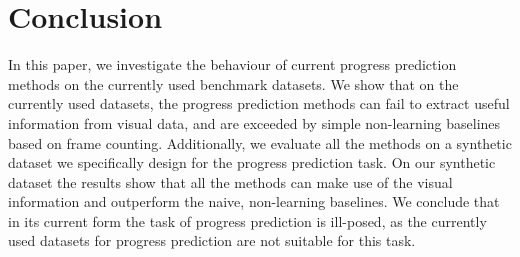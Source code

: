 \section{Conclusion}
\label{sec:conclusion}
In this paper, we investigate the behaviour of current progress prediction methods on the currently used benchmark datasets. 
We show that on the currently used datasets, the progress prediction methods can fail to extract useful information from visual data, and are exceeded by simple non-learning baselines based on frame counting. 
Additionally, we evaluate all the methods on a synthetic dataset we specifically design for the progress prediction task. 
On our synthetic dataset the results show that all the methods can make use of the visual information and outperform the naive, non-learning baselines. 
We conclude that in its current form the task of progress prediction is ill-posed, as the currently used datasets for progress prediction are not suitable for this task.